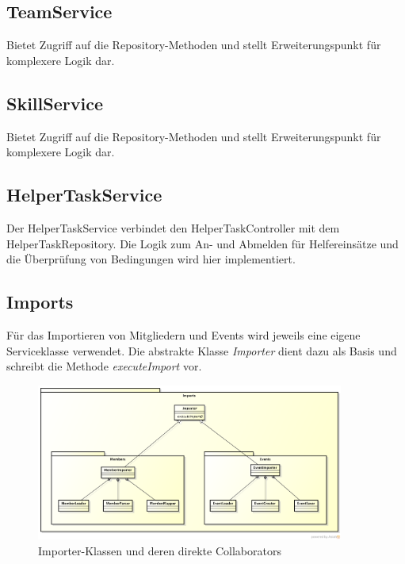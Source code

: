 	\subsection{TeamService}
		Bietet Zugriff auf die Repository-Methoden und stellt Erweiterungspunkt für komplexere Logik dar.
	
	\subsection{SkillService}
		Bietet Zugriff auf die Repository-Methoden und stellt Erweiterungspunkt für komplexere Logik dar.
	
	\subsection{HelperTaskService}
		Der HelperTaskService verbindet den HelperTaskController mit dem HelperTaskRepository. Die Logik zum An- und Abmelden für Helfereinsätze und die Überprüfung von Bedingungen wird hier implementiert.
		
	
	\subsection{Imports}
		Für das Importieren von Mitgliedern und Events wird jeweils eine eigene Serviceklasse verwendet. Die abstrakte Klasse \textit{Importer} dient dazu als Basis und schreibt die Methode \textit{executeImport} vor.
		
	    \begin{figure}[h]
	  		\vspace{-5pt}
	    	\centering
	    	 \includegraphics[width=0.9\textwidth]{content/architekturdokumentation/images/ImportPackageDesign.png}
	  		\vspace{-25pt}
			\caption{Importer-Klassen und deren direkte Collaborators}
		\end{figure}
		
